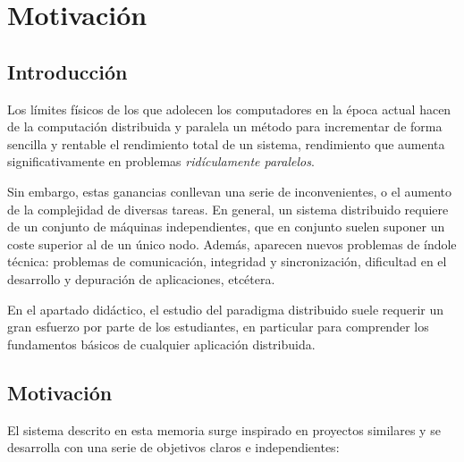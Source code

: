 \chapter{Motivación}

\section{Introducción}

Los límites físicos de los que adolecen los computadores en la época actual hacen de la computación distribuida y paralela un método para incrementar de forma sencilla y rentable el rendimiento total de un sistema, rendimiento que aumenta significativamente en problemas \textit{ridículamente paralelos}\citationneeded.

Sin embargo, estas ganancias conllevan una serie de inconvenientes, o el aumento de la complejidad de diversas tareas. En general, un sistema distribuido requiere de un conjunto de máquinas independientes, que en conjunto suelen suponer un coste superior al de un único nodo. Además, aparecen nuevos problemas de índole técnica: problemas de comunicación, integridad y sincronización, dificultad en el desarrollo y depuración de aplicaciones, etcétera.

En el apartado didáctico, el estudio del paradigma distribuido suele requerir un gran esfuerzo por parte de los estudiantes, en particular para comprender los fundamentos básicos de cualquier aplicación distribuida.

\section{Motivación}

El sistema descrito en esta memoria surge inspirado en proyectos similares y se desarrolla con una serie de objetivos claros e independientes:

